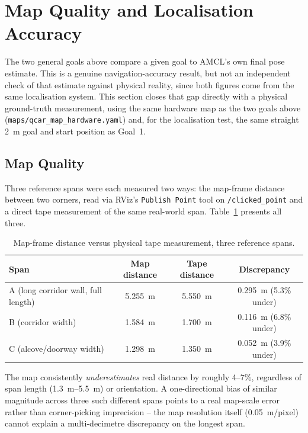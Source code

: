 \section{Map Quality and Localisation Accuracy}
\label{sec:results-map-localization}

The two general goals above compare a given goal to AMCL's own final
pose estimate. This is a genuine navigation-accuracy result, but not
an independent check of that estimate against physical reality, since
both figures come from the same localisation system. This section
closes that gap directly with a physical ground-truth measurement,
using the same hardware map as the two goals above
(\texttt{maps/qcar\_map\_hardware.yaml}) and, for the localisation
test, the same straight \SI{2}{\meter} goal and start position as
Goal~1.

\subsection{Map Quality}
\label{sec:results-map-quality}

Three reference spans were each measured two ways: the map-frame
distance between two corners, read via RViz's \texttt{Publish Point}
tool on \texttt{/clicked\_point} and a direct tape measurement of the
same real-world span. Table~\ref{tab:results-map-quality} presents all
three.

\begin{table}[htbp]
  \centering
  \caption{Map-frame distance versus physical tape measurement, three reference spans.}
  \label{tab:results-map-quality}
  \begin{tabular}{@{}lccc@{}}
    \toprule
    Span & Map distance & Tape distance & Discrepancy \\
    \midrule
    A (long corridor wall, full length) & \SI{5.255}{\meter} & \SI{5.550}{\meter} & \SI{0.295}{\meter} (5.3\% under) \\
    B (corridor width) & \SI{1.584}{\meter} & \SI{1.700}{\meter} & \SI{0.116}{\meter} (6.8\% under) \\
    C (alcove/doorway width) & \SI{1.298}{\meter} & \SI{1.350}{\meter} & \SI{0.052}{\meter} (3.9\% under) \\
    \bottomrule
  \end{tabular}
\end{table}

The map consistently \emph{underestimates} real distance by roughly
4--7\%, regardless of span length (\SIrange{1.3}{5.5}{\meter}) or
orientation. A one-directional bias of similar magnitude across three
such different spans points to a real map-scale error rather than
corner-picking imprecision -- the map resolution itself
(\SI{0.05}{\meter}/pixel) cannot explain a multi-decimetre discrepancy
on the longest span.

